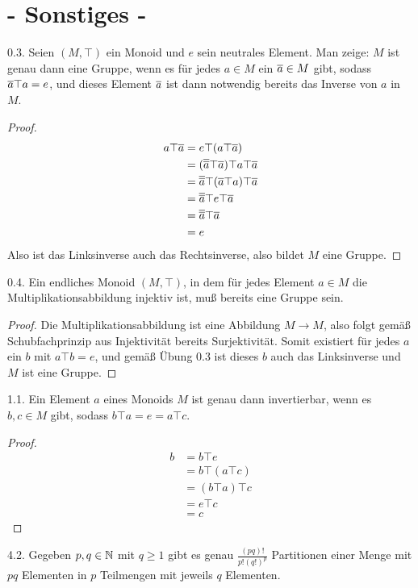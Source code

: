\documentclass{article}
\newcommand{\ex}[1]{\tit{Übung} #1.}
\begin{document}
	\section*{\centering - Sonstiges -}
		\ex{0.3} Seien $(M, \top)$ ein Monoid und $e$ sein neutrales Element. Man zeige: $M$ ist genau dann eine Gruppe, wenn es für jedes $a \in M$ ein $\overline{{a}} \in M$ gibt, sodass $\overline{{a}} \top a = e$, und dieses Element $\overline{{a}}$ ist dann notwendig bereits das Inverse von $a$ in $M$.
		\begin{proof}
			\begin{align*}
				  a \top \overline{{a}} 
				  &= e \top (a \top \overline{{a}})\\
				  &= (\overline{{\overline{{a}}}} \top \overline{{a}}) \top a \top \overline{{a}}\\
				  &= \overline{{\overline{{a}}}} \top (\overline{{a}} \top a) \top \overline{{a}}\\
				  &= \overline{{\overline{{a}}}} \top e \top \overline{{a}}\\
				  &= \overline{{\overline{{a}}}} \top \overline{{a}}\\
				  &= e
			\end{align*}
			Also ist das Linksinverse auch das Rechtsinverse, also bildet $M$ eine Gruppe.
		\end{proof}
		\newpar
		\ex{0.4} Ein endliches Monoid $(M, \top)$, in dem für jedes Element $a \in M$ die Multiplikationsabbildung injektiv ist, muß bereits eine Gruppe sein.
		\begin{proof}
			Die Multiplikationsabbildung ist eine Abbildung $M \to M$, also folgt gemäß Schubfachprinzip aus Injektivität bereits Surjektivität. Somit existiert für jedes $a$ ein $b$ mit $a \top b = e$, und gemäß Übung 0.3 ist dieses $b$ auch das Linksinverse und $M$ ist eine Gruppe.
		\end{proof}
		\newpar
		\ex{1.1} Ein Element $a$ eines Monoids $M$ ist genau dann invertierbar, wenn es $b, c \in M$ gibt, sodass $b \top a = e = a \top c$.
		\begin{proof}
			\begin{align*}
				b 
				&= b \top e\\
				&= b \top (a \top c)\\
				&= (b \top a) \top c\\
				&= e \top c\\
				&= c
			\end{align*}
		\end{proof}
		\newpar
		\ex{4.2} Gegeben $p,q \in \mathbb{N}$ mit $q \geq 1$ gibt es genau $\frac{(pq)!}{p!(q!)^p}$ Partitionen einer Menge mit $pq$ Elementen in $p$ Teilmengen mit jeweils $q$ Elementen.
\end{document}
